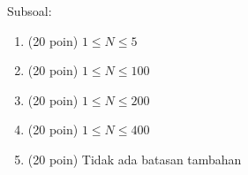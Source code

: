 Subsoal:
\begin{enumerate}
    \item (20 poin) $1\le{N}\le{5}$
    \item (20 poin) $1\le{N}\le{100}$
    \item (20 poin) $1\le{N}\le{200}$
    \item (20 poin) $1\le{N}\le{400}$
    \item (20 poin) Tidak ada batasan tambahan
\end{enumerate}
